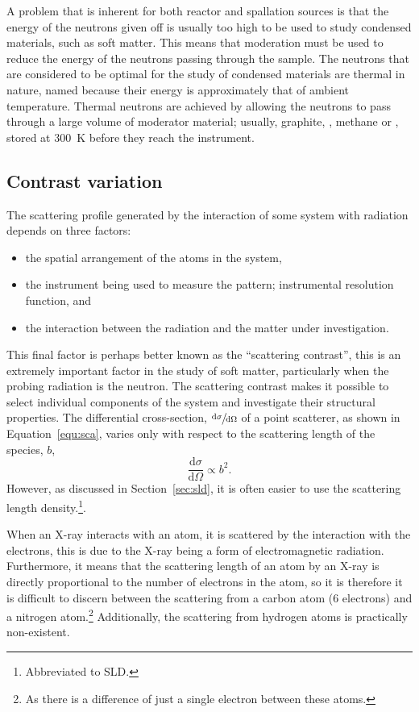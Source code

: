 A problem that is inherent for both reactor and spallation sources is that the energy of the neutrons given off is usually too high to be used to study condensed materials, such as soft matter.
This means that moderation must be used to reduce the energy of the neutrons passing through the sample.
The neutrons that are considered to be optimal for the study of condensed materials are thermal in nature, named because their energy is approximately that of ambient temperature.
Thermal neutrons are achieved by allowing the neutrons to pass through a large volume of moderator material; usually, graphite, , methane or , stored at \SI{300}{\kelvin} before they reach the instrument.\autocite{sivia_elementary_2011}

\subsection{Contrast variation}
\label{convar}
The scattering profile generated by the interaction of some system with radiation depends on three factors:
%
\begin{itemize}
    \item the spatial arrangement of the atoms in the system,
    \item the instrument being used to measure the pattern; instrumental resolution function, and
    \item the interaction between the radiation and the matter under investigation.
\end{itemize}
%
This final factor is perhaps better known as the ``scattering contrast'', this is an extremely important factor in the study of soft matter, particularly when the probing radiation is the neutron.
The scattering contrast makes it possible to select individual components of the system and investigate their structural properties.\autocite{schurtenberger_contrast_2002}
The differential cross-section, $\sfrac{\text{d}\sigma}{\text{d}\Omega}$ of a point scatterer, as shown in Equation~\ref{equ:sca}, varies only with respect to the scattering length of the species, $b$,
%
\begin{equation}
    \frac{\text{d}\sigma}{\text{d}\Omega} \propto b^2.
\end{equation}
%
However, as discussed in Section~\ref{sec:sld}, it is often easier to use the scattering length density.\footnote{Abbreviated to SLD.}.

When an X-ray interacts with an atom, it is scattered by the interaction with the electrons, this is due to the X-ray being a form of electromagnetic radiation.
Furthermore, it means that the scattering length of an atom by an X-ray is directly proportional to the number of electrons in the atom, so it is therefore it is difficult to discern between the scattering from a carbon atom (6 electrons) and a nitrogen atom.\footnote{As there is a difference of just a single electron between these atoms.}
Additionally, the scattering from hydrogen atoms is practically non-existent.

